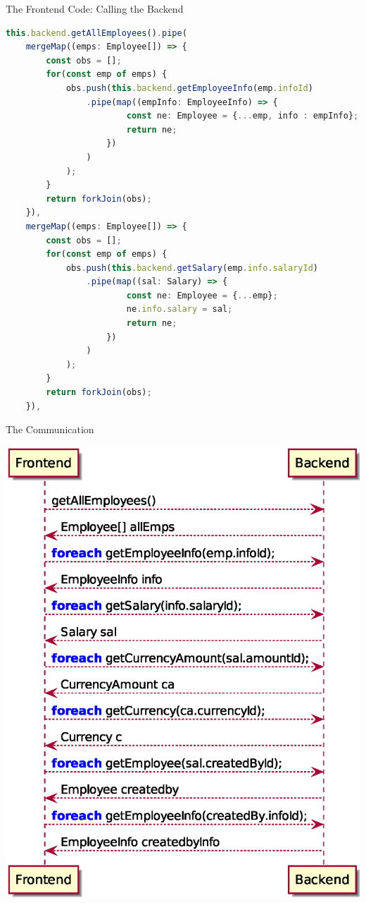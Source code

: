 \documentclass[aspectratio=169]{beamer}
\begin{document}
	\begin{frame}[fragile]{The Frontend Code: Calling the Backend}
\begin{lstlisting}[language=TypeScript,basicstyle=\footnotesize\ttfamily,tabsize=2]
this.backend.getAllEmployees().pipe(
	mergeMap((emps: Employee[]) => {
		const obs = [];
		for(const emp of emps) {
			obs.push(this.backend.getEmployeeInfo(emp.infoId)
				.pipe(map((empInfo: EmployeeInfo) => {
						const ne: Employee = {...emp, info : empInfo};
						return ne;
					})
				)
			);
		}
		return forkJoin(obs);
	}),
	mergeMap((emps: Employee[]) => {
		const obs = [];
		for(const emp of emps) {
			obs.push(this.backend.getSalary(emp.info.salaryId)
				.pipe(map((sal: Salary) => {
						const ne: Employee = {...emp};
						ne.info.salary = sal;
						return ne;
					})
				)
			);
		}
		return forkJoin(obs);
	}),
\end{lstlisting}
\end{frame}

	\begin{frame}[fragile]{The Communication}
		\begin{center}
			\includegraphics[height=0.9\textheight]{restbackend.eps}
		\end{center}
	\end{frame}
	
\end{document}
